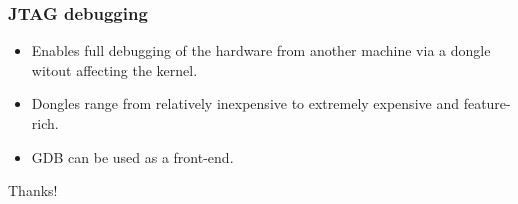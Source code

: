 \documentclass{beamer}
\begin{document}
\begin{frame}
\frametitle{JTAG debugging}
\begin{itemize}
	\item Enables full debugging of the hardware from another machine via a dongle witout affecting the kernel.
	\item Dongles range from relatively inexpensive to extremely expensive and feature-rich.
	\item GDB can be used as a front-end.
\end{itemize}
\end{frame}

\begin{frame}
\Huge{\centerline{Thanks!}}
\end{frame}
\end{document}
